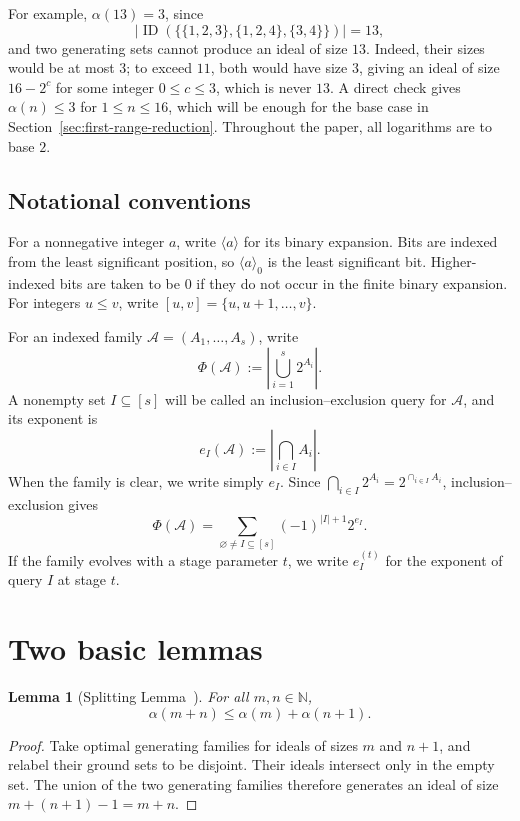 \documentclass[11pt]{article}
\newtheorem{lemma}[lemma]{Lemma}
\theoremstyle{definition}
\theoremstyle{remark}
\newcommand{\ID}{\operatorname{ID}}
\begin{document}
For example, $\alpha(13)=3$, since
\[
  \bigl|\ID(\{\{1,2,3\},\{1,2,4\},\{3,4\}\})\bigr|=13,
\]
and two generating sets cannot produce an ideal of size $13$. Indeed, their sizes would be at most $3$; to exceed $11$, both would have size $3$, giving an ideal of size $16-2^c$ for some integer $0\le c\le3$, which is never $13$. A direct check gives $\alpha(n)\le 3$ for $1\le n\le16$, which will be enough for the base case in Section~\ref{sec:first-range-reduction}.
Throughout the paper, all logarithms are to base $2$.

\subsection{Notational conventions}

For a nonnegative integer $a$, write $\langle a\rangle$ for its binary expansion. Bits are indexed from the least significant position, so $\langle a\rangle_0$ is the least significant bit. Higher-indexed bits are taken to be $0$ if they do not occur in the finite binary expansion. For integers $u\le v$, write $[u,v]=\{u,u+1,\ldots,v\}$.

For an indexed family $\mathcal A=(A_1,\ldots,A_s)$, write
\[
  \Phi(\mathcal A):=\left|\bigcup_{i=1}^{s}2^{A_i}\right|.
\]
A nonempty set $I\subseteq[s]$ will be called an inclusion--exclusion query for $\mathcal A$, and its exponent is
\[
  e_I(\mathcal A):=\left|\bigcap_{i\in I}A_i\right|.
\]
When the family is clear, we write simply $e_I$. Since
$\bigcap_{i\in I}2^{A_i}=2^{\cap_{i\in I}A_i}$, inclusion--exclusion gives
\begin{equation}
  \Phi(\mathcal A)=
  \sum_{\varnothing\ne I\subseteq[s]}(-1)^{|I|+1}2^{e_I}.
  \label{eq:inclusion-exclusion}
\end{equation}
If the family evolves with a stage parameter $t$, we write $e_I^{(t)}$ for the exponent of query $I$ at stage $t$.

\section{Two basic lemmas}\label{sec:basic-lemmas}

\begin{lemma}[Splitting Lemma~\cite{ChandranGajjalaMeel26}]\label{lem:splitting}
For all $m,n\in\mathbb N$,
\[
  \alpha(m+n)\le\alpha(m)+\alpha(n+1).
\]
\end{lemma}

\begin{proof}
Take optimal generating families for ideals of sizes $m$ and $n+1$,
and relabel their ground sets to be disjoint. Their ideals intersect only
in the empty set. The union of the two generating families therefore
generates an ideal of size $m+(n+1)-1=m+n$.
\end{proof}
\end{document}
